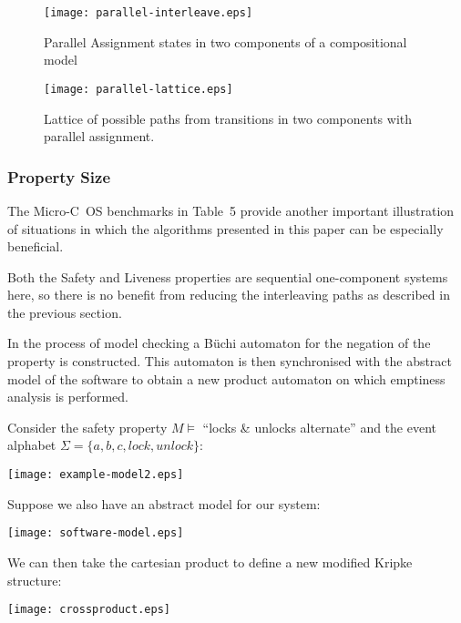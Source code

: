 \begin{figure}
\begin{center}
\texttt{[image: parallel-interleave.eps]}
\end{center}
\caption{Parallel Assignment states in two components of a compositional model}

\label{parallel-interleave}
\end{figure}

\begin{figure}
\begin{center}
\texttt{[image: parallel-lattice.eps]}
\end{center}
\caption{Lattice of possible paths from transitions in two components
  with parallel assignment.}
\label{parallel-lattice}
\end{figure}

\subsubsection{Property Size}

The Micro-C~OS benchmarks in Table~5 provide another important
illustration of situations in which the algorithms presented in this
paper can be especially beneficial.

Both the Safety and Liveness properties are sequential one-component
systems here, so there is no benefit from reducing the interleaving
paths as described in the previous section.

In the process of model checking a B\"uchi automaton for the negation
of the property is constructed.  This automaton is then synchronised
with the abstract model of the software to obtain a new product
automaton on which emptiness analysis is performed.

Consider the safety property $M \models $ ``locks \& unlocks alternate''
and the event alphabet $\Sigma = \{a,b,c,lock,unlock\}$:
\begin{center}
\resizebox{2.75in}{!}
{\texttt{[image: example-model2.eps]}}
\end{center}

Suppose we also have an abstract model for our system:
\begin{center}
\texttt{[image: software-model.eps]}
\end{center}

We can then take the cartesian product to define a new modified Kripke
structure:
\begin{center}
\texttt{[image: crossproduct.eps]}
\end{center}

